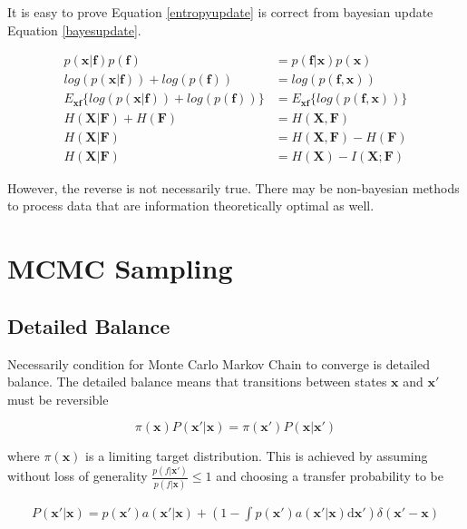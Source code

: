 \documentclass{article}
\begin{document}
It is easy to prove Equation \ref{entropyupdate} is correct from bayesian update Equation \ref{bayesupdate}.

\begin{equation*}
\begin{aligned}
  p(\bm{x}|\bm{f})p(\bm{f}) &= p(\bm{f}|\bm{x})p(\bm{x})\\
  log(p(\bm{x}|\bm{f})) + log(p(\bm{f})) &= log(p(\bm{f},\bm{x}))\\
  E_{\bm{x}\bm{f}}\{log(p(\bm{x}|\bm{f})) + log(p(\bm{f}))\} &= E_{\bm{x}\bm{f}}\{log(p(\bm{f},\bm{x}))\}\\  
  H(\bm{X}|\bm{F})+H(\bm{F}) &= H(\bm{X},\bm{F}) \\
  H(\bm{X}|\bm{F}) &= H(\bm{X},\bm{F}) - H(\bm{F}) \\
  H(\bm{X}|\bm{F}) &= H(\bm{X}) - I(\bm{X};\bm{F})
\end{aligned}
\end{equation*}

However, the reverse is not necessarily true.  There may be non-bayesian methods to process data that are information theoretically optimal as well.

\section{MCMC Sampling} \label{detailed-balance}

\subsection{Detailed Balance}

Necessarily condition for Monte Carlo Markov Chain to converge is detailed balance. The detailed balance means that transitions between states
$\mathbf{x}$ and $\mathbf{x}'$ must be reversible

\begin{equation}
  \pi(\mathbf{x})P(\mathbf{x}'|\mathbf{x}) = \pi(\mathbf{x}')P(\mathbf{x}|\mathbf{x}')
\end{equation}

where $\pi(\mathbf{x})$ is a limiting target distribution. This is achieved by assuming without loss of generality
$\frac{p(f|\mathbf{x}')}{p(f|\mathbf{x})} \leq 1$ and choosing a transfer probability to be 

\begin{equation} \label{transfer1}
  \begin{gathered}
    P(\mathbf{x}'|\mathbf{x}) = p(\mathbf{x}') a(\mathbf{x}'|\mathbf{x}) + \left(1 - \int p(\mathbf{x}') a(\mathbf{x}'|\mathbf{x}) \mathrm{d}\mathbf{x}'\right)\delta(\mathbf{x}' - \mathbf{x}) 
  \end{gathered}
\end{equation}
\end{document}
